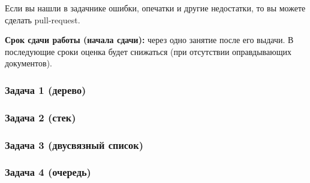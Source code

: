 Если вы нашли в задачнике ошибки, опечатки и другие недостатки, то вы можете сделать pull-request. 

\textbf{Срок сдачи работы (начала сдачи):} через одно занятие после его выдачи. В последующие сроки оценка будет снижаться (при отсутствии оправдывающих документов).


\subsubsection{Задача 1 (дерево)} 



\subsubsection{Задача 2 (стек)}



\subsubsection{Задача 3 (двусвязный список)}



\subsubsection{Задача 4 (очередь)}

